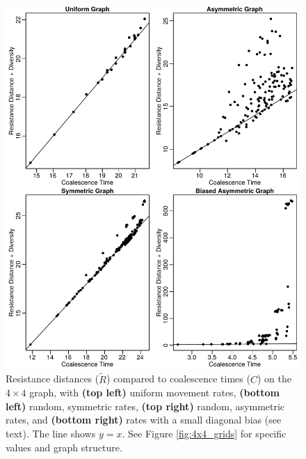 \documentclass{article}
\newcommand{\comdist}{\widetilde{R}}
\begin{document}
\begin{figure}
\centering
     \includegraphics[scale=1]{figs/RvsC}
    \caption{
        Resistance distances ($\comdist$) compared to coalescence times ($C$)
        on the $4 \times 4$ graph, with 
        \textbf{(top left)} uniform movement rates,
        \textbf{(bottom left)} random, symmetric rates,
        \textbf{(top right)} random, asymmetric rates,
        and \textbf{(bottom right)} rates with a small diagonal bias (see text).
        The line shows $y=x$.
        See Figure \ref{fig:4x4_grids} for specific values and graph structure.
    \label{fig:RvsC}
}
\end{figure}
\end{document}
